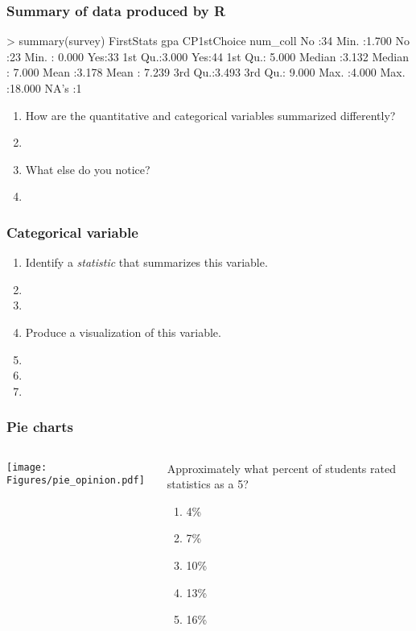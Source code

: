 \begin{frame}[fragile]
\frametitle{Summary of data produced by R}
\begin{lcverbatim}
> summary(survey)
 FirstStats      gpa        CP1stChoice    num_coll
 No :34     Min.   :1.700   No :23      Min.   : 0.000
 Yes:33     1st Qu.:3.000   Yes:44      1st Qu.: 5.000
            Median :3.132               Median : 7.000
            Mean   :3.178               Mean   : 7.239
            3rd Qu.:3.493               3rd Qu.: 9.000
            Max.   :4.000               Max.   :18.000
            NA's   :1
\end{lcverbatim}
\begin{clicker}{}
\begin{enumerate}
\item How are the quantitative and categorical variables summarized differently?
\item[]
\item What else do you notice?
\item[]
\end{enumerate}
\end{clicker}
\end{frame}

\begin{frame}[fragile]
\frametitle{Categorical variable}
\begin{clicker}{}
\begin{enumerate}
\item Identify a \emph{statistic} that summarizes this variable.
\item[]
\item[]
\item Produce a visualization of this variable.
\item[]
\item[]
\item[]
\end{enumerate}
\end{clicker}
\vskip100pt
\end{frame}


\begin{frame}
\frametitle{Pie charts}
\begin{columns}
\texttt{[image: Figures/pie\_opinion.pdf]}
\begin{clicker}{Approximately what percent of students rated statistics as a 5?}
\begin{enumerate}
\item 4\%
\item 7\%
\item 10\%
\item 13\%
\item 16\%
\end{enumerate}
\end{clicker}
\end{columns}
\end{frame}


